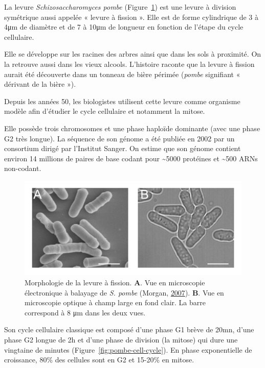 \documentclass[12pt,a4paper,twoside,openright]{book}
\begin{document}
La levure \emph{Schizosaccharomyces pombe} (Figure~\ref{fig:pombe}) est
une levure à division symétrique aussi appelée « levure à fission ».
Elle est de forme cylindrique de 3 à 4μm de diamètre et de 7 à 10μm de
longueur en fonction de l'étape du cycle cellulaire.

Elle se développe sur les racines des arbres ainsi que dans les sols à
proximité. On la retrouve aussi dans les vieux alcools. L'histoire
raconte que la levure à fission aurait été découverte dans un tonneau de
bière périmée (\emph{pombe} signifiant « dérivant de la bière »).

Depuis les années 50, les biologistes utilisent cette levure comme
organisme modèle afin d'étudier le cycle cellulaire et notamment la
mitose.

Elle possède trois chromosomes et une phase haploïde dominante (avec une
phase G2 très longue). La séquence de son génome a été publiée en 2002
par un consortium dirigé par l'Institut Sanger. On estime que son génome
contient environ 14 millions de paires de base codant pour
\textasciitilde{}5000 protéines et \textasciitilde{}500 ARNs non-codant.

\begin{figure}[htbp]
\centering
\includegraphics{figures/intro/pombe.png}
\caption[Morphologie de la levure à fission]{\label{fig:pombe}Morphologie
de la levure à fission. \textbf{A}. Vue en microscopie électronique à
balayage de \emph{S. pombe} (Morgan, \hyperref[ref-Morgan2007]{2007}).
\textbf{B}. Vue en microscopie optique à champ large en fond clair. La
barre correspond à 8 μm dans les deux vues.}
\end{figure}

Son cycle cellulaire classique est composé d'une phase G1 brève de 20mn,
d'une phase G2 longue de 2h et d'une phase de division (la mitose) qui
dure une vingtaine de minutes (Figure~\ref{fig:pombe-cell-cycle}). En
phase exponentielle de croissance, 80\% des cellules sont en G2 et
15-20\% en mitose.
\end{document}
